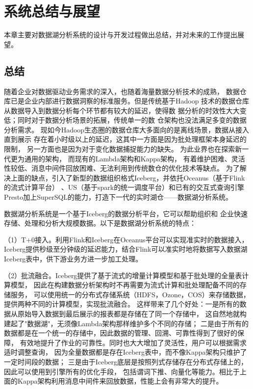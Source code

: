 
\chapter{系统总结与展望}

本章主要对数据湖分析系统的设计与开发过程做出总结，并对未来的工作提出展望。

\section{总结}

随着企业对数据驱动业务需求的深入，也随着海量数据分析技术的成熟，
数据仓库已是企业内部进行数据洞察的标准服务。但是传统基于Hadoop
技术的数据仓库从数据导入到数据分析每个环节都有较大的延迟，使得数
据分析的时效性大大变低；同时对于数据分析场景的拓展，传统单一的数
仓架构也没法满足多变的数据分析需求。
现如今Hadoop生态圈的数据仓库大多面向的是离线场景，数据从接入直到展示
存在着小时级以上的延迟，这其中一方面是因为批处理框架本身延迟的限制，
另一方面也是因为对于变化数据捕捉能力的缺失。
为此业界也在探索新一代更为通用的架构，
而现有的Lambda架构和Kappa架构，
有着维护困难、灵活性较低、消息中间件回放困难、无法利用到传统数仓的优化技术等缺点。
为了解决上面的缺点，引入了新型的数据组织格式Iceberg，并依托Oceanus（基于Flink的流式计算平台）
、US（基于spark的统一调度平台）和已有的交互式查询引擎Presto加上SuperSQL的能力，打造下一代的实时湖仓——数据湖分析系统。

数据湖分析系统是一个基于Iceberg的数据分析平台，它可以帮助组织和
企业快速存储、处理和分析大规模数据。以下是数据湖分析系统的特点：

（1）T+0接入。利用Flink和Iceberg在Oceanus平台可以实现准实时的数据接入，
Iceberg提供秒级至分钟级的延迟能力，结合Flink可以准实时地将数据写入数据湖Iceberg表中，供下游业务方进一步加工处理。

（2）批流融合。Iceberg提供了基于流式的增量计算模型和基于批处理的全量表计算模型，
因此在构建数据分析架构时不再需要为流式计算和批处理配备不同的存储服务，
可以使用统一的分布式存储系统（HDFS，Ozone，COS）来存储数据，提供两种不同的计算模型，实现批流融合。
这样带来了几个好处：一是所有的数据从原始导入数据到最后展示的报表都是存储在了同一个存储中，
这自然地就构建起了"数据湖"，无须像Lambda架构那样维护多个不同的存储；
二是由于所有的数据都是在一个统一的存储中，因此数据的管理、回溯、可靠性得到了很好的保障，
有效地提升了作业的可靠性。同时也大大增加了灵活性，用户可以根据需求适时调整查询，
因为全量数据都是存在Iceberg表中，而不像Kappa架构只维护了一定时间段的数据；
三是由于Iceberg底层是按照列式存储存在分布式存储上的，因此可以使用到引擎所有的优化手段，
包括谓词下推、向量化等能力。相比于上面的Kappa架构利用消息中间件来回放数据，性能上会有非常大的提升。

